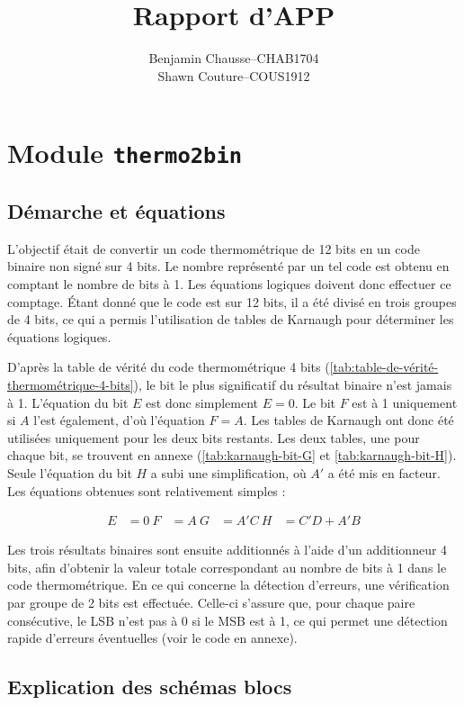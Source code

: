\documentclass[a11paper]{article}
\title{Rapport d'APP}
\author{
  \addtolength{\tabcolsep}{-0.4em}
  \begin{tabular}{rcl} %
      Benjamin Chausse & -- & CHAB1704 \\
      Shawn Couture    & -- & COUS1912 \\
  \end{tabular}
}
\begin{document}
\maketitle
\newpage
\tableofcontents
\newpage

\section{Module \texttt{thermo2bin}}
\subsection{Démarche et équations}

L’objectif était de convertir un code thermométrique de 12 bits en un code
binaire non signé sur 4 bits. Le nombre représenté par un tel code est obtenu
en comptant le nombre de bits à 1. Les équations logiques doivent donc
effectuer ce comptage. Étant donné que le code est sur 12 bits, il a été
divisé en trois groupes de 4 bits, ce qui a permis l'utilisation de tables de
Karnaugh pour déterminer les équations logiques.

D'après la table de vérité du code thermométrique 4 bits
(\ref{tab:table-de-vérité-thermométrique-4-bits}), le bit le plus
significatif du résultat binaire n’est jamais à 1. L'équation du bit $E$ est
donc simplement $E = 0$. Le bit $F$ est à 1 uniquement si $A$ l’est
également, d’où l’équation $F = A$. Les tables de Karnaugh ont donc été
utilisées uniquement pour les deux bits restants. Les deux tables, une pour
chaque bit, se trouvent en annexe (\ref{tab:karnaugh-bit-G} et
\ref{tab:karnaugh-bit-H}). Seule l'équation du bit $H$ a subi une
simplification, où $A'$ a été mis en facteur. Les équations obtenues sont
relativement simples :

\begin{align}
	E & = 0 \
	F & = A \
	G & = A'C \
	H & = C'D + A'B
\end{align}

Les trois résultats binaires sont ensuite additionnés à l’aide d’un
additionneur 4 bits, afin d’obtenir la valeur totale correspondant au nombre
de bits à 1 dans le code thermométrique. En ce qui concerne la détection
d'erreurs, une vérification par groupe de 2 bits est effectuée. Celle-ci
s’assure que, pour chaque paire consécutive, le LSB n’est pas à 0 si le MSB
est à 1, ce qui permet une détection rapide d’erreurs éventuelles (voir le
code en annexe).

\subsection{Explication des schémas blocs}
\end{document}
